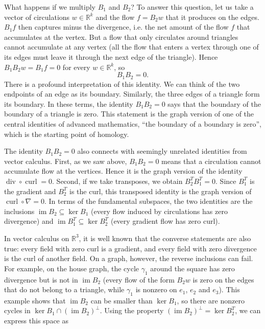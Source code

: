 \documentclass[11pt,a4paper]{article}
\theoremstyle{plain}
\theoremstyle{definition}
\newcommand{\R}{\mathbb{R}}
\begin{document}
What happens if we multiply $B_1$ and $B_2$? To answer this question, let us take a vector of circulations $w\in\R^k$ and the flow $f=B_2w$ that it produces on the edges. $B_1f$ then captures minus the divergence, i.e. the net amount of the flow $f$ that accumulates at the vertex. But a flow that only circulates around triangles cannot accumulate at any vertex (all the flow that enters a vertex through one of its edges must leave it through the next edge of the triangle). Hence $B_1B_2w=B_1f=0$ for every $w\in\R^k$, so
\begin{equation}\label{eq:bb}
B_1B_2=0 .
\end{equation}
There is a profound interpretation of this identity. We can think of the two endpoints of an edge as its boundary. Similarly, the three edges of a triangle form its boundary. In these terms, the identity $B_1B_2=0$ says that the boundary of the boundary of a triangle is zero. This statement is the graph version of one of the central identities of advanced mathematics, ``the boundary of a boundary is zero'', which is the starting point of homology.

The identity $B_1B_2=0$ also connects with seemingly unrelated identities from vector calculus. First, as we saw above, $B_1B_2=0$ means that a circulation cannot accumulate flow at the vertices. Hence it is the graph version of the identity $\operatorname{div}\circ\operatorname{curl}=0$. Second, if we take transposes, we obtain $B_2^TB_1^T=0$. Since $B_1^T$ is the gradient and $B_2^T$ is the curl, this transposed identity is the graph version of $\operatorname{curl}\circ\nabla=0$. In terms of the fundamental subspaces, the two identities are the inclusions $\operatorname{im}B_2\subseteq\ker B_1$ (every flow induced by circulations has zero divergence) and $\operatorname{im}B_1^T\subseteq\ker B_2^T$ (every gradient flow has zero curl).

In vector calculus on $\R^3$, it is well known that the converse statements are also true: every field with zero curl is a gradient, and every field with zero divergence is the curl of another field. On a graph, however, the reverse inclusions can fail. For example, on the house graph, the cycle $\gamma_1$ around the square has zero divergence but is not in $\operatorname{im}B_2$ (every flow of the form $B_2w$ is zero on the edges that do not belong to a triangle, while $\gamma_1$ is nonzero on $e_1$, $e_2$ and $e_3$). This example shows that $\operatorname{im}B_2$ can be smaller than $\ker B_1$, so there are nonzero cycles in $\ker B_1\cap(\operatorname{im}B_2)^\perp$. Using the property $(\operatorname{im}B_2)^\perp=\ker B_2^T$, we can express this space as
\end{document}
